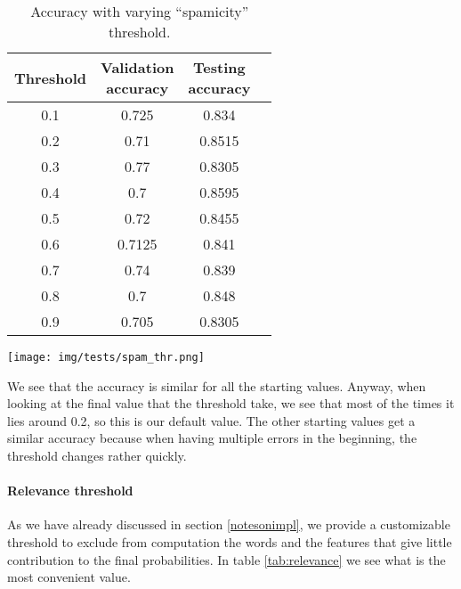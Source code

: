 \begin{center}
\begin{table}[h]
\begin{minipage}{.5\linewidth}
\begin{tabular}{cccc}
\toprule
Threshold & \shortstack{Validation\\ accuracy} & \shortstack{Testing\\ accuracy}\\
\midrule
0.1  & 0.725 & 0.834\\
0.2  & 0.71 & 0.8515 \\
0.3  & 0.77 & 0.8305 \\
0.4  & 0.7 & 0.8595 \\
0.5  & 0.72 & 0.8455 \\
0.6  & 0.7125 & 0.841 \\
0.7  & 0.74 & 0.839 \\
0.8  & 0.7 & 0.848 \\
0.9  & 0.705 & 0.8305 \\
\bottomrule
\end{tabular}
\end{minipage}
\begin{minipage}{.5\linewidth}
\texttt{[image: img/tests/spam\_thr.png]}
    \label{fig:spamthr}
\end{minipage}
\caption{Accuracy with varying ``spamicity'' threshold.}
\end{table}
\label{tab:spamthr}
\end{center}

We see that the accuracy is similar for all the starting values. Anyway, when looking at the final value that the threshold take, we see that most of the times it lies around 0.2, so this is our default value. The other starting values get a similar accuracy because when having multiple errors in the beginning, the threshold changes rather quickly.

\paragraph{Relevance threshold}
As we have already discussed in section \ref{notesonimpl}, we provide a customizable threshold to exclude from computation the words and the features that give little contribution to the final probabilities. In table \ref{tab:relevance} we see what is the most convenient value.

